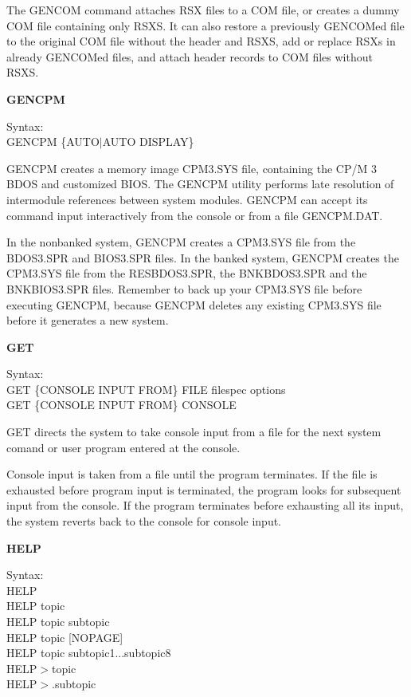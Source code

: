 The GENCOM command attaches RSX files to a COM file, or creates a
dummy COM file containing only RSXS. It can also restore a previously
GENCOMed file to the original COM file without the header and RSXS,
add or replace RSXs in already GENCOMed files, and attach header
records to COM files without RSXS.

\textbf{GENCPM}

\hangindent=0.7cm Syntax:\\
GENCPM \{AUTO\(|\)AUTO DISPLAY\}

GENCPM creates a memory image CPM3.SYS file, containing the CP/M 3
BDOS and customized BIOS. The GENCPM utility performs late resolution
of intermodule references between system modules. GENCPM can accept
its command input interactively from the console or from a file
GENCPM.DAT.

In the nonbanked system, GENCPM creates a CPM3.SYS file from the
BDOS3.SPR and BIOS3.SPR files. In the banked system, GENCPM creates
the CPM3.SYS file from the RESBDOS3.SPR, the BNKBDOS3.SPR and the
BNKBIOS3.SPR files. Remember to back up your CPM3.SYS file before
executing GENCPM, because GENCPM deletes any existing CPM3.SYS file
before it generates a new system.

\textbf{GET}

\hangindent=0.7cm Syntax:\\
GET \{CONSOLE INPUT FROM\} FILE filespec options\\
GET \{CONSOLE INPUT FROM\} CONSOLE

GET directs the system to take console input from a file for the next
system comand or user program entered at the console.

Console input is taken from a file until the program terminates. If
the file is exhausted before program input is terminated, the program
looks for subsequent input from the console. If the program terminates
before exhausting all its input, the system reverts back to the
console for console input.

\textbf{HELP}

\hangindent=0.7cm Syntax:\\
HELP\\
HELP topic\\
HELP topic subtopic\\
HELP topic [NOPAGE]\\
HELP topic subtopic1...subtopic8\\
HELP\(>\)topic\\
HELP\(>\).subtopic

